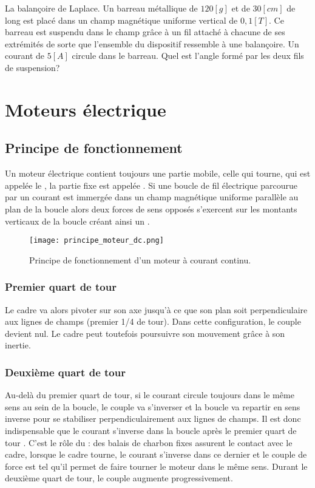 \begin{exercise}
    La balançoire de Laplace.
    Un barreau métallique de \(120[g]\) et de \(30[cm]\) de long est placé dans un champ magnétique uniforme vertical de \(0,1[T]\).
    Ce barreau est suspendu dans le champ grâce à un fil attaché à chacune de ses extrémités de sorte que l'ensemble du dispositif ressemble à une balançoire. Un courant de \(5[A]\) circule dans le barreau. Quel est l'angle formé par les deux fils de suspension?
\end{exercise}

\newpage

\section{Moteurs électrique}
\subsection{Principe de fonctionnement}
Un moteur électrique contient toujours une partie mobile, celle qui tourne, qui est appelée le , la partie fixe est appelée .
Si une boucle de fil électrique parcourue par un courant est immergée dans un champ magnétique uniforme parallèle au plan de la boucle alors deux forces de sens opposés s'exercent sur les montants verticaux de la boucle créant ainsi un .

\begin{figure}[ht]
    \centering
    \texttt{[image: principe\_moteur\_dc.png]}
    \caption{Principe de fonctionnement d'un moteur à courant continu.}
    \label{principe_moteur_dc}
\end{figure}

\subsubsection*{Premier quart de tour}
Le cadre va alors pivoter sur son axe jusqu'à ce que son plan soit perpendiculaire aux lignes de champs (premier 1/4 de tour). Dans cette configuration, le couple devient nul. Le cadre peut toutefois poursuivre son mouvement grâce à son inertie.

\subsubsection*{Deuxième quart de tour}
Au-delà du premier quart de tour, si le courant circule toujours dans le même sens au sein de la boucle, le couple va s'inverser et la boucle va repartir en sens inverse pour se stabiliser perpendiculairement aux lignes de champs. Il est donc indispensable que le courant s'inverse dans la boucle après le premier quart de tour . C'est le rôle du  : des balais de charbon fixes assurent le contact avec le cadre, lorsque le cadre tourne, le courant s'inverse dans ce dernier et le couple de force est tel qu'il permet de faire tourner le moteur dans le même sens.
Durant le deuxième quart de tour, le couple augmente progressivement.

